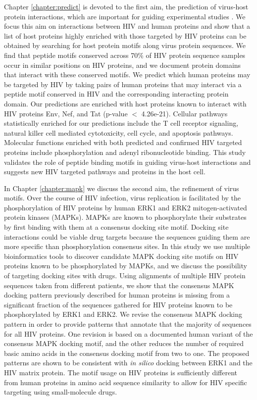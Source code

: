 Chapter \ref{chapter:predict} is devoted to the first aim, the
prediction of virus-host protein interactions, which are important for
guiding experimental studies
\cite{jansen2003bayesian,lee2004probabilistic}. We focus this aim on
interactions between HIV and human proteins and show that a list of
host proteins highly enriched with those targeted by HIV proteins can
be obtained by searching for host protein motifs along virus protein
sequences. We find that peptide motifs conserved across 70\% of HIV
protein sequence samples occur in similar positions on HIV proteins,
and we document protein domains that interact with these conserved
motifs. We predict which human proteins may be targeted by HIV by
taking pairs of human proteins that may interact via a peptide motif
conserved in HIV and the corresponding interacting protein domain. Our
predictions are enriched with host proteins known to interact with HIV
proteins Env, Nef, and Tat (p-value $<$ 4.26e-21). Cellular pathways
statistically enriched for our predictions include the T cell receptor
signaling, natural killer cell mediated cytotoxicity, cell cycle, and
apoptosis pathways. Molecular functions enriched with both predicted
and confirmed HIV targeted proteins include phosphorylation and adenyl
ribonucleotide binding. This study validates the role of peptide
binding motifs in guiding virus-host interactions and suggests new HIV
targeted pathways and proteins in the host cell.

In Chapter \ref{chapter:mapk} we discuss the second aim, the
refinement of virus motifs. Over the course of HIV infection, virus
replication is facilitated by the phosphorylation of HIV proteins by
human ERK1 and ERK2 mitogen-activated protein kinases (MAPKs). MAPKs
are known to phosphorylate their substrates by first binding with them
at a consensus docking site motif. Docking site interactions could be
viable drug targets because the sequences guiding them are more
specific than phosphorylation consensus sites. In this study we use
multiple bioinformatics tools to discover candidate MAPK docking site
motifs on HIV proteins known to be phosphorylated by MAPKs, and we
discuss the possibility of targeting docking sites with drugs. Using
alignments of multiple HIV protein sequences taken from different
patients, we show that the consensus MAPK docking pattern previously
described for human proteins is missing from a significant fraction of
the sequences gathered for HIV proteins known to be phosphorylated by
ERK1 and ERK2. We revise the consensus MAPK docking pattern in order
to provide patterns that annotate that the majority of sequences for
all HIV proteins. One revision is based on a documented human variant
of the consensus MAPK docking motif, and the other reduces the number
of required basic amino acids in the consensus docking motif from two
to one. The proposed patterns are shown to be consistent with
\textit{in silico} docking between ERK1 and the HIV matrix
protein. The motif usage on HIV proteins is sufficiently different
from human proteins in amino acid sequence similarity to allow for HIV
specific targeting using small-molecule drugs.

